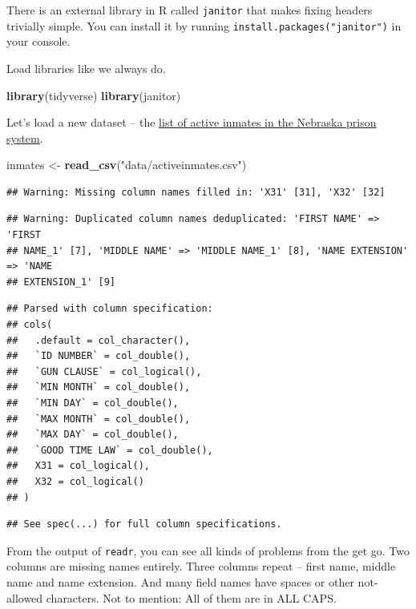 \documentclass[]{book}
\newenvironment{Shaded}{\begin{snugshade}}{\end{snugshade}}
\newcommand{\KeywordTok}[1]{\textcolor[rgb]{0.13,0.29,0.53}{\textbf{#1}}}
\newcommand{\NormalTok}[1]{#1}
\newcommand{\StringTok}[1]{\textcolor[rgb]{0.31,0.60,0.02}{#1}}
\begin{document}
There is an external library in R called \texttt{janitor} that makes fixing headers trivially simple. You can install it by running \texttt{install.packages("janitor")} in your console.

Load libraries like we always do.

\begin{Shaded}
\begin{Highlighting}[]
\KeywordTok{library}\NormalTok{(tidyverse)}
\KeywordTok{library}\NormalTok{(janitor)}
\end{Highlighting}
\end{Shaded}

Let's load a new dataset -- the \href{https://unl.box.com/s/wlurwk2ks880x65ao0l67k8pmjk04gy2}{list of active inmates in the Nebraska prison system}.

\begin{Shaded}
\begin{Highlighting}[]
\NormalTok{inmates <-}\StringTok{ }\KeywordTok{read_csv}\NormalTok{(}\StringTok{"data/activeinmates.csv"}\NormalTok{)}
\end{Highlighting}
\end{Shaded}

\begin{verbatim}
## Warning: Missing column names filled in: 'X31' [31], 'X32' [32]
\end{verbatim}

\begin{verbatim}
## Warning: Duplicated column names deduplicated: 'FIRST NAME' => 'FIRST
## NAME_1' [7], 'MIDDLE NAME' => 'MIDDLE NAME_1' [8], 'NAME EXTENSION' => 'NAME
## EXTENSION_1' [9]
\end{verbatim}

\begin{verbatim}
## Parsed with column specification:
## cols(
##   .default = col_character(),
##   `ID NUMBER` = col_double(),
##   `GUN CLAUSE` = col_logical(),
##   `MIN MONTH` = col_double(),
##   `MIN DAY` = col_double(),
##   `MAX MONTH` = col_double(),
##   `MAX DAY` = col_double(),
##   `GOOD TIME LAW` = col_double(),
##   X31 = col_logical(),
##   X32 = col_logical()
## )
\end{verbatim}

\begin{verbatim}
## See spec(...) for full column specifications.
\end{verbatim}

From the output of \texttt{readr}, you can see all kinds of problems from the get go. Two columns are missing names entirely. Three columns repeat -- first name, middle name and name extension. And many field names have spaces or other not-allowed characters. Not to mention: All of them are in ALL CAPS.
\end{document}
